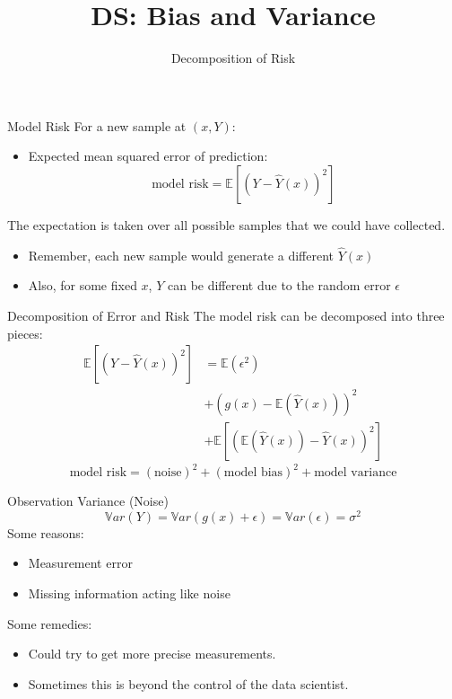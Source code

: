 \documentclass[aspectratio=169]{../latex_main/tntbeamer}  %
\title[Statistics]{DS: Bias and Variance}
\subtitle{Decomposition of Risk}
\begin{document}
	
	\maketitle
	\begin{frame}{Model Risk}
	    For a new sample at $(x, Y)$:
	    \begin{itemize}
	        \item Expected mean squared error of prediction:
	        \begin{equation*}
	            \text{model risk} = \mathbb{E}\left[(Y-\widehat{Y}(x))^2\right]
	        \end{equation*}
	    \end{itemize}
	    The expectation is taken over all possible samples that we could have collected.
	    \begin{itemize}
	        \item Remember, each new sample would generate a different $\widehat{Y}(x)$
	        \item Also, for some fixed $x$, $Y$ can be different due to the random error $\epsilon$
	    \end{itemize}
	\end{frame}
	
	
	\begin{frame}[c]{Decomposition of Error and Risk}
	    The model risk can be decomposed into three pieces:
	    \begin{align*}
	        \mathbb{E}\left[(Y-\hat{Y}(x))^2\right] &= \mathbb{E}(\epsilon^2)\\
	        &+ (g(x) - \mathbb{E}(\hat{Y}(x)))^2\\
	        &+ \mathbb{E}\left[(\mathbb{E}(\hat{Y}(x))-\hat{Y}(x))^2\right]
	    \end{align*}
	    \begin{equation*}
	        \text{model risk} = (\text{noise})^2 + (\text{model bias})^2 + \text{model variance}
	    \end{equation*}
	\end{frame}
	
	
	\begin{frame}[c]{Observation Variance (Noise)}
	    \begin{equation*}
	        \mathbb{V}ar(Y) = \mathbb{V}ar(g(x) + \epsilon) = \mathbb{V}ar(\epsilon) = \sigma^2
	    \end{equation*}
	    Some reasons:
	    \begin{itemize}
	        \item Measurement error
	        \item Missing information acting like noise
	    \end{itemize}
	    \bigskip
	    Some remedies:
	    \begin{itemize}
	        \item Could try to get more precise measurements.
	        \item Sometimes this is beyond the control of the data scientist.
	    \end{itemize}
	\end{frame}
	
\end{document}
